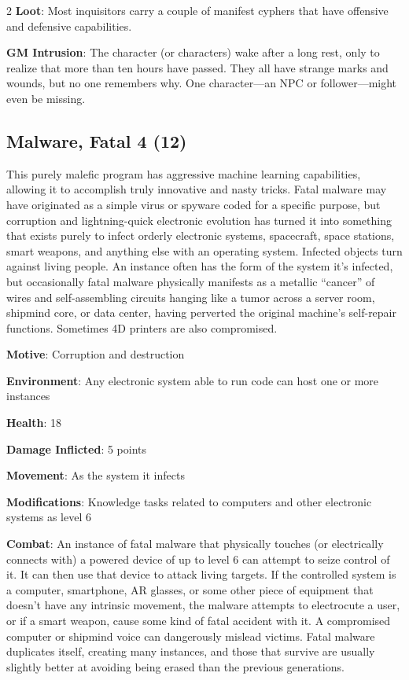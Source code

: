 \begin{multicols}{2}
\textbf{Loot}: Most inquisitors carry a couple of manifest cyphers that have offensive and defensive capabilities.

\textbf{GM Intrusion}: The character (or characters) wake after a long rest, only to realize that more than ten hours have passed. They all have strange marks and wounds, but no one remembers why. One character—an NPC or follower—might even be missing.

\subsection{Malware, Fatal 4 (12)}

This purely malefic program has aggressive machine learning capabilities, allowing it to accomplish truly innovative and nasty tricks. Fatal malware may have originated as a simple virus or spyware coded for a specific purpose, but corruption and lightning-quick electronic evolution has turned it into something that exists purely to infect orderly electronic systems, spacecraft, space stations, smart weapons, and anything else with an operating system. Infected objects turn against living people. An instance often has the form of the system it’s infected, but occasionally fatal malware physically manifests as a metallic “cancer” of wires and self-assembling circuits hanging like a tumor across a server room, shipmind core, or data center, having perverted the original machine’s self-repair functions. Sometimes 4D printers are also compromised. 

\textbf{Motive}: Corruption and destruction 

\textbf{Environment}: Any electronic system able to run code can host one or more instances 

\textbf{Health}: 18 

\textbf{Damage Inflicted}:  5 points 

\textbf{Movement}: As the system it infects 

\textbf{Modifications}: Knowledge tasks related to computers and other electronic systems as level 6 

\textbf{Combat}: An instance of fatal malware that physically touches (or electrically connects with) a powered device of up to level 6 can attempt to seize control of it. It can then use that device to attack living targets. If the controlled system is a computer, smartphone, AR glasses, or some other piece of equipment that doesn’t have any intrinsic movement, the malware attempts to electrocute a user, or if a smart weapon, cause some kind of fatal accident with it. A compromised computer or shipmind voice can dangerously mislead victims. Fatal malware duplicates itself, creating many instances, and those that survive are usually slightly better at avoiding being erased than the previous generations. 


\end{multicols}
